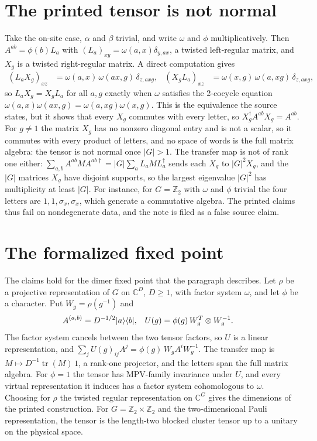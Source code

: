 \documentclass{article}
\begin{document}
\section{The printed tensor is not normal}
Take the on-site case, $\alpha$ and $\beta$ trivial, and write $\omega$ and
$\phi$ multiplicatively. Then $A^{ab}=\phi(b)L_a$ with
$(L_a)_{xy}=\omega(a,x)\delta_{y,ax}$, a twisted left-regular matrix, and
$X_g$ is a twisted right-regular matrix. A direct computation gives
\begin{align}
    (L_aX_g)_{xz}
     & =\omega(a,x)\,\omega(ax,g)\,\delta_{z,axg},
     &
    (X_gL_a)_{xz}
     & =\omega(x,g)\,\omega(a,xg)\,\delta_{z,axg},
    \label{eq:rmp_spt_fixed_point_commutation}
\end{align}
so $L_aX_g=X_gL_a$ for all $a,g$ exactly when $\omega$ satisfies the 2-cocycle
equation $\omega(a,x)\omega(ax,g)=\omega(a,xg)\omega(x,g)$.
This is the equivalence the source states, but it shows that every $X_g$
commutes with every letter, so $X_g^\dagger A^{ab}X_g=A^{ab}$. For $g\neq1$ the matrix $X_g$ has no nonzero diagonal
entry and is not a scalar, so it commutes with every product of letters, and no
space of words is the full matrix algebra: the tensor is not normal once
$|G|>1$. The transfer map is not of rank one either:
$\sum_{a,b}A^{ab}MA^{ab\dagger}=|G|\sum_aL_aML_a^\dagger$ sends each $X_g$ to
$|G|^2X_g$, and the $|G|$ matrices $X_g$ have disjoint supports, so the largest
eigenvalue $|G|^2$ has multiplicity at least $|G|$. For instance, for
$G=\mathbb Z_2$ with $\omega$ and $\phi$ trivial the four letters are
$1,1,\sigma_x,\sigma_x$, which generate a commutative algebra. The printed claims
thus fail on nondegenerate data, and the note is filed as a false source claim.

\section{The formalized fixed point}
The claims hold for the dimer fixed point that the paragraph describes. Let
$\rho$ be a projective representation of $G$ on $\mathbb C^D$, $D\ge1$, with
factor system $\omega$, and let $\phi$ be a character. Put $W_g=\rho(g^{-1})$ and
\begin{align}
    A^{(a,b)} & =D^{-1/2}|a\rangle\langle b|,
              &
    U(g)      & =\phi(g)\,W_g^{T}\otimes W_g^{-1}.
    \label{eq:rmp_spt_fixed_point_formalized}
\end{align}
The factor system cancels between the two tensor factors, so $U$ is a linear
representation, and $\sum_jU(g)_{ij}A^j=\phi(g)\,W_gA^iW_g^{-1}$. The transfer
map is $M\mapsto D^{-1}\operatorname{tr}(M)\,1$, a rank-one projector, and the
letters span the full matrix algebra. For $\phi=1$ the tensor has MPV-family
invariance under $U$, and every virtual representation it induces has a factor
system cohomologous to $\omega$. Choosing for $\rho$ the twisted regular
representation on $\mathbb C^G$ gives the dimensions of the printed
construction. For $G=\mathbb Z_2\times\mathbb Z_2$ and the two-dimensional Pauli
representation, the tensor is the length-two blocked cluster tensor up to a
unitary on the physical space.
\end{document}
